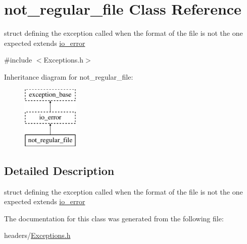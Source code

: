 \hypertarget{structnot__regular__file}{\section{not\-\_\-regular\-\_\-file \-Class \-Reference}
\label{structnot__regular__file}
}


struct defining the exception called when the format of the file is not the one expected extends \hyperlink{structio__error}{io\-\_\-error}  




{\ttfamily \#include $<$\-Exceptions.\-h$>$}

\-Inheritance diagram for not\-\_\-regular\-\_\-file\-:\begin{figure}[H]
\begin{center}
\leavevmode
\includegraphics[height=3.000000cm]{structnot__regular__file}
\end{center}
\end{figure}


\subsection{\-Detailed \-Description}
struct defining the exception called when the format of the file is not the one expected extends \hyperlink{structio__error}{io\-\_\-error} 

\-The documentation for this class was generated from the following file\-:\begin{DoxyCompactItemize}
\item 
headers/\hyperlink{_exceptions_8h}{\-Exceptions.\-h}\end{DoxyCompactItemize}
